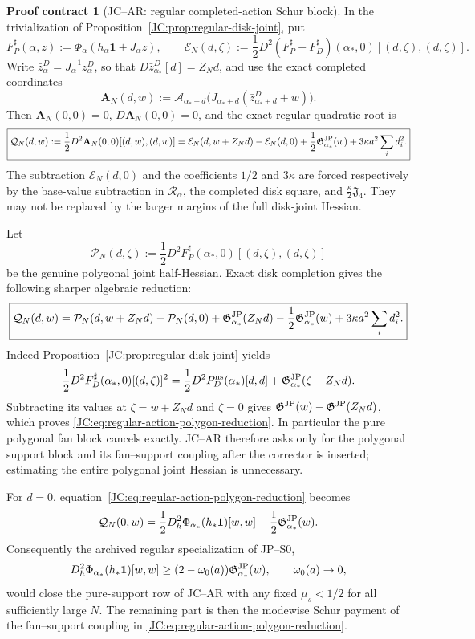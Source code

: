 \documentclass[11pt]{amsart}
\providecommand{\mathscr}{\mathcal}
\numberwithin{equation}{section}
\theoremstyle{definition}
\newtheorem{contract}[theorem]{Proof contract}
\theoremstyle{remark}
\newcommand{\Jfour}{\mathfrak J_4}
\newcommand{\Gjp}{\mathfrak G^{\rm JP}}
\providecommand{\mathscr}[1]{\mathcal{#1}}
\begin{document}
\begin{contract}[JC--AR: regular completed-action Schur block]
\label{JC:con:JC-AR}
In the trivialization of Proposition~\ref{JC:prop:regular-disk-joint}, put
\[
 F_P^\sharp(\alpha,z)
 :=\Phi_\alpha(h_\alpha\mathbf1+J_\alpha z),
 \qquad
 \mathcal E_N(d,\zeta)
 :=\frac12D^2(F_P^\sharp-F_D^\sharp)(\alpha_*,0)
 [(d,\zeta),(d,\zeta)].
\]
Write \(\bar z_\alpha^D=J_\alpha^{-1}z_\alpha^D\), so that
\(D\bar z_{\alpha_*}^D[d]=Z_Nd\), and use the exact completed coordinates
\[
 \mathbf A_N(d,w):=
 \mathscr A_{\alpha_*+d}
 \bigl(J_{\alpha_*+d}(\bar z_{\alpha_*+d}^D+w)\bigr).
\]
Then \(\mathbf A_N(0,0)=0\), \(D\mathbf A_N(0,0)=0\), and the exact
regular quadratic root is
\begin{equation}\label{JC:eq:regular-action-root}
 \boxed{
 \mathcal Q_N(d,w):=\frac12D^2\mathbf A_N(0,0)[(d,w),(d,w)]
 =\mathcal E_N(d,w+Z_Nd)-\mathcal E_N(d,0)
 +\frac12\Gjp_{\alpha_*}(w)
 +3\kappa a^2\sum_i d_i^2.}
\end{equation}
The subtraction \(\mathcal E_N(d,0)\) and the coefficients
\(1/2\) and \(3\kappa\) are forced respectively by the base-value
subtraction in \(\mathscr R_\alpha\), the completed disk square, and
\(\frac\kappa2\Jfour\).  They may not be replaced by the larger margins
of the full disk-joint Hessian.

Let
\[
 \mathcal P_N(d,\zeta):=
 \frac12D^2F_P^\sharp(\alpha_*,0)
 [(d,\zeta),(d,\zeta)]
\]
be the genuine polygonal joint half-Hessian.  Exact disk completion gives
the following sharper algebraic reduction:
\begin{equation}\label{JC:eq:regular-action-polygon-reduction}
 \boxed{
 \mathcal Q_N(d,w)=
 \mathcal P_N(d,w+Z_Nd)-\mathcal P_N(d,0)
 +\Gjp_{\alpha_*}(Z_Nd)-\frac12\Gjp_{\alpha_*}(w)
 +3\kappa a^2\sum_i d_i^2.}
\end{equation}
Indeed Proposition~\ref{JC:prop:regular-disk-joint} yields
\[
 \frac12D^2F_D^\sharp(\alpha_*,0)[(d,\zeta)]^2
 =\frac12D^2P_D^{\rm ns}(\alpha_*)[d,d]
  +\Gjp_{\alpha_*}(\zeta-Z_Nd).
\]
Subtracting its values at $\zeta=w+Z_Nd$ and $\zeta=0$ gives
$\Gjp(w)-\Gjp(Z_Nd)$, which proves
\eqref{JC:eq:regular-action-polygon-reduction}.  In particular the pure
polygonal fan block cancels exactly.  JC--AR therefore asks only for the
polygonal support block and its fan--support coupling after the corrector
is inserted; estimating the entire polygonal joint Hessian is unnecessary.

For $d=0$, equation~\eqref{JC:eq:regular-action-polygon-reduction} becomes
\begin{equation}\label{JC:eq:regular-action-pure-support-identity}
 \mathcal Q_N(0,w)=
 \frac12D_h^2\Phi_{\alpha_*}(h_*\mathbf1)[w,w]
 -\frac12\Gjp_{\alpha_*}(w).
\end{equation}
Consequently the archived regular specialization of JP--S0,
\[
 D_h^2\Phi_{\alpha_*}(h_*\mathbf1)[w,w]
 \ge(2-\omega_0(a))\Gjp_{\alpha_*}(w),
 \qquad \omega_0(a)\to0,
\]
would close the pure-support row of JC--AR with any fixed
$\mu_s<1/2$ for all sufficiently large $N$.  The remaining part is then
the modewise Schur payment of the fan--support coupling in
\eqref{JC:eq:regular-action-polygon-reduction}.


\end{contract}
\end{document}
